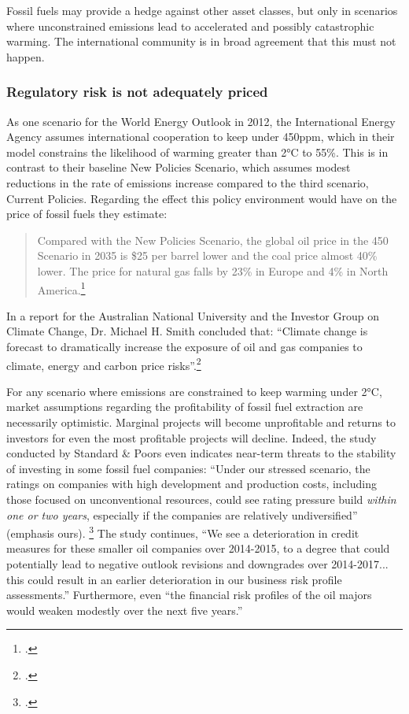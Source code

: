 Fossil fuels may provide a hedge against other asset classes, but only in scenarios where unconstrained emissions lead to accelerated and possibly catastrophic warming. 
The international community is in broad agreement that this must not happen.


	\subsubsection {Regulatory risk is not adequately priced} 



As one scenario for the World Energy Outlook in 2012, the International Energy Agency assumes international cooperation to keep  under 450ppm, which in their model constrains the likelihood of warming greater than 2°C to 55\%. 
This is in contrast to their baseline New Policies Scenario, which assumes modest reductions in the rate of emissions increase compared to the third scenario, Current Policies. 
Regarding the effect this policy environment would have on the price of fossil fuels they estimate:
\begin{quote}Compared with the New Policies Scenario, the global oil price in the 450 Scenario in 2035 is \$25 per barrel lower and the coal price almost 40\% lower. The price for natural gas falls by 23\% in Europe and 4\% in North America.\footcite[][p. 257]{IEA2012}
\end{quote}
In a report for the Australian National University and the Investor Group on Climate Change, Dr. Michael H. Smith concluded that: ``Climate change is forecast to dramatically increase the exposure of oil and gas companies to climate, energy and carbon price risks''.\footcite[][p. 14]{RisksForInvestors}



For any scenario where emissions are constrained to keep warming under 2°C, market assumptions regarding the profitability of fossil fuel extraction are necessarily optimistic. 
Marginal projects will become unprofitable and returns to investors for even the most profitable projects will decline. 
Indeed, the study conducted by Standard \& Poors even indicates near-term threats to the stability of investing in some fossil fuel companies: ``Under our stressed scenario, the ratings on companies with high development and production costs, including those focused on unconventional resources, could see rating pressure build \emph{within one or two years}, especially if the companies are relatively undiversified'' (emphasis ours). \footcite{SandPConstrained}
The study continues, ``We see a deterioration in credit measures for these smaller oil companies over 2014-2015, to a degree that could potentially lead to negative outlook revisions and downgrades over 2014-2017... this could result in an earlier deterioration in our business risk profile assessments.''
Furthermore, even ``the financial risk profiles of the oil majors would weaken modestly over the next five years.''
  

